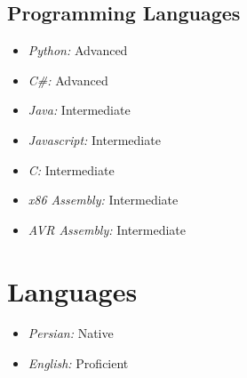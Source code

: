 \documentclass{article}
\begin{document}
\subsection{Programming Languages}
\begin{itemize}
        \item \emph{Python:} Advanced
        \item \emph{C\#:} Advanced
        \item \emph{Java:} Intermediate
        \item \emph{Javascript:} Intermediate
        \item \emph{C:} Intermediate
        \item \emph{x86 Assembly:} Intermediate
        \item \emph{AVR Assembly:} Intermediate
\end{itemize}

\section{Languages}
\begin{itemize}
        \item \emph{Persian:} Native
        \item \emph{English:} Proficient
\end{itemize}
\end{document}
